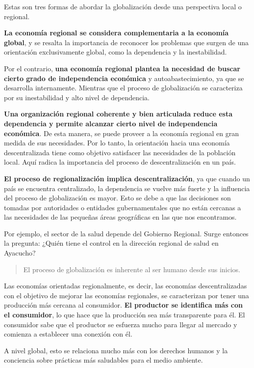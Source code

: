 \documentclass[
  letterpaper,
  DIV=11,
  numbers=noendperiod]{scrartcl}
\begin{document}
Estas son tres formas de abordar la globalización desde una perspectiva
local o regional.

\textbf{La economía regional se considera complementaria a la economía
global}, y se resalta la importancia de reconocer los problemas que
surgen de una orientación exclusivamente global, como la dependencia y
la inestabilidad.

Por el contrario, \textbf{una economía regional plantea la necesidad de
buscar cierto grado de independencia económica} y autoabastecimiento, ya
que se desarrolla internamente. Mientras que el proceso de globalización
se caracteriza por su inestabilidad y alto nivel de dependencia.

\textbf{Una organización regional coherente y bien articulada reduce
esta dependencia y permite alcanzar cierto nivel de independencia
económica}. De esta manera, se puede proveer a la economía regional en
gran medida de sus necesidades. Por lo tanto, la orientación hacia una
economía descentralizada tiene como objetivo satisfacer las necesidades
de la población local. Aquí radica la importancia del proceso de
descentralización en un país.

\textbf{El proceso de regionalización implica descentralización}, ya que
cuando un país se encuentra centralizado, la dependencia se vuelve más
fuerte y la influencia del proceso de globalización es mayor. Esto se
debe a que las decisiones son tomadas por autoridades o entidades
gubernamentales que no están cercanas a las necesidades de las pequeñas
áreas geográficas en las que nos encontramos.

Por ejemplo, el sector de la salud depende del Gobierno Regional. Surge
entonces la pregunta: ¿Quién tiene el control en la dirección regional
de salud en Ayacucho?

\begin{quote}
El proceso de globalización es inherente al ser humano desde sus
inicios.
\end{quote}

Las economías orientadas regionalmente, es decir, las economías
descentralizadas con el objetivo de mejorar las economías regionales, se
caracterizan por tener una producción más cercana al consumidor.
\textbf{El productor se identifica más con el consumidor}, lo que hace
que la producción sea más transparente para él. El consumidor sabe que
el productor se esfuerza mucho para llegar al mercado y comienza a
establecer una conexión con él.

A nivel global, esto se relaciona mucho más con los derechos humanos y
la conciencia sobre prácticas más saludables para el medio ambiente.
\end{document}
